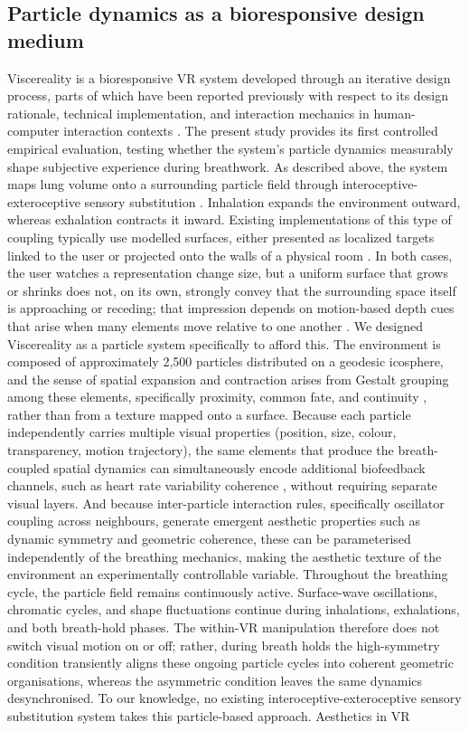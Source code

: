 \subsection{Particle dynamics as a bioresponsive design medium}
Viscereality is a bioresponsive VR system developed through an iterative design process, parts of which have been reported previously with respect to its design rationale, technical implementation, and interaction mechanics in human-computer interaction contexts \citep{fejer2025viscereality, fejer2026breathing}. The present study provides its first controlled empirical evaluation, testing whether the system's particle dynamics measurably shape subjective experience during breathwork. As described above, the system maps lung volume onto a surrounding particle field through interoceptive-exteroceptive sensory substitution \citep{GoralEtAl2024}. Inhalation expands the environment outward, whereas exhalation contracts it inward. Existing implementations of this type of coupling typically use modelled surfaces, either presented as localized targets linked to the user \citep{Wald2023} or projected onto the walls of a physical room \citep{GoralEtAl2024}. In both cases, the user watches a representation change size, but a uniform surface that grows or shrinks does not, on its own, strongly convey that the surrounding space itself is approaching or receding; that impression depends on motion-based depth cues that arise when many elements move relative to one another \citep{Rogers1979}. We designed Viscereality as a particle system specifically to afford this. The environment is composed of approximately 2,500 particles distributed on a geodesic icosphere, and the sense of spatial expansion and contraction arises from Gestalt grouping among these elements, specifically proximity, common fate, and continuity \citep{Wagemans2012}, rather than from a texture mapped onto a surface. Because each particle independently carries multiple visual properties (position, size, colour, transparency, motion trajectory), the same elements that produce the breath-coupled spatial dynamics can simultaneously encode additional biofeedback channels, such as heart rate variability coherence \citep{fejer2026breathing}, without requiring separate visual layers. And because inter-particle interaction rules, specifically oscillator coupling across neighbours, generate emergent aesthetic properties such as dynamic symmetry and geometric coherence, these can be parameterised independently of the breathing mechanics, making the aesthetic texture of the environment an experimentally controllable variable. Throughout the breathing cycle, the particle field remains continuously active. Surface-wave oscillations, chromatic cycles, and shape fluctuations continue during inhalations, exhalations, and both breath-hold phases. The within-VR manipulation therefore does not switch visual motion on or off; rather, during breath holds the high-symmetry condition transiently aligns these ongoing particle cycles into coherent geometric organisations, whereas the asymmetric condition leaves the same dynamics desynchronised. To our knowledge, no existing interoceptive-exteroceptive sensory substitution system takes this particle-based approach. Aesthetics in VR 
